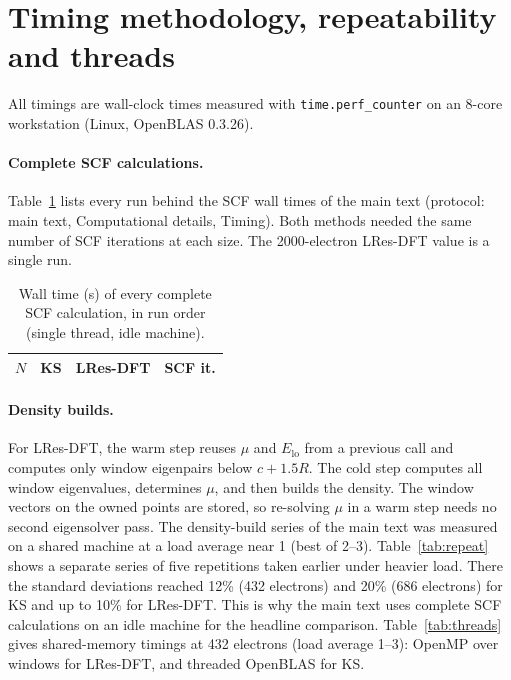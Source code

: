\documentclass[aps,prb,onecolumn,superscriptaddress,floatfix]{revtex4-2}
\begin{document}
\section{Timing methodology, repeatability and threads}

All timings are wall-clock times measured with \texttt{time.perf\_counter} on an 8-core workstation (Linux, OpenBLAS
0.3.26).

\paragraph*{Complete SCF calculations.} Table~\ref{tab:rigorousall} lists every run behind the SCF wall times of the main
text (protocol: main text, Computational details, Timing). Both methods needed
the same number of SCF iterations at each size. The 2000-electron LRes-DFT value is a single run.

\begin{table}[h]
\caption{\label{tab:rigorousall}Wall time (s) of every complete SCF calculation, in run order (single thread, idle machine).}
\begin{ruledtabular}
\begin{tabular}{rllc}
$N$ & KS & LRes-DFT & SCF it. \\
\hline

\end{tabular}
\end{ruledtabular}
\end{table}

\paragraph*{Density builds.} For LRes-DFT, the warm step reuses $\mu$ and $E_\mathrm{lo}$ from a previous call and computes only
window eigenpairs below $c+1.5R$. The cold step computes all window eigenvalues, determines $\mu$, and then builds the
density. The window vectors on the owned points are stored, so re-solving $\mu$ in a warm step needs no second eigensolver
pass. The density-build series of the main text was measured on a shared machine at a load average near 1 (best of 2--3).
Table~\ref{tab:repeat} shows a separate series of five repetitions taken earlier under heavier load. There the standard
deviations reached 12\% (432 electrons) and 20\% (686 electrons) for KS and up to 10\% for LRes-DFT. This is why the main
text uses complete SCF calculations on an idle machine for the headline comparison. Table~\ref{tab:threads} gives
shared-memory timings at 432 electrons (load average 1--3): OpenMP over windows for LRes-DFT, and threaded OpenBLAS for KS.
\end{document}
